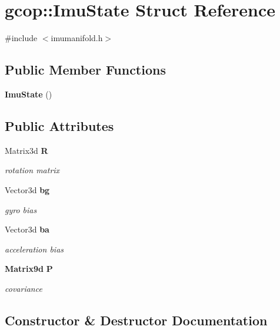 \section{gcop\-:\-:\-Imu\-State \-Struct \-Reference}
\label{structgcop_1_1ImuState}


{\ttfamily \#include $<$imumanifold.\-h$>$}

\subsection*{\-Public \-Member \-Functions}
\begin{DoxyCompactItemize}
\item 
{\bf \-Imu\-State} ()
\end{DoxyCompactItemize}
\subsection*{\-Public \-Attributes}
\begin{DoxyCompactItemize}
\item 
\-Matrix3d {\bf \-R}
\begin{DoxyCompactList}\small\item\em rotation matrix \end{DoxyCompactList}\item 
\-Vector3d {\bf bg}
\begin{DoxyCompactList}\small\item\em gyro bias \end{DoxyCompactList}\item 
\-Vector3d {\bf ba}
\begin{DoxyCompactList}\small\item\em acceleration bias \end{DoxyCompactList}\item 
{\bf \-Matrix9d} {\bf \-P}
\begin{DoxyCompactList}\small\item\em covariance \end{DoxyCompactList}\end{DoxyCompactItemize}


\subsection{\-Constructor \& \-Destructor \-Documentation}
